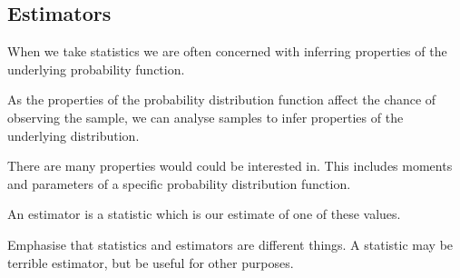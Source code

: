 
\subsection{Estimators}

When we take statistics we are often concerned with inferring properties of the underlying probability function.

As the properties of the probability distribution function affect the chance of observing the sample, we can analyse samples to infer properties of the underlying distribution.

There are many properties would could be interested in. This includes moments and parameters of a specific probability distribution function.

An estimator is a statistic which is our estimate of one of these values.

Emphasise that statistics and estimators are different things. A statistic may be terrible estimator, but be useful for other purposes. 


